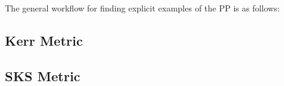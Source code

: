 The general workflow for finding explicit examples of the PP is as follows:
%
%

\subsection{Kerr Metric}
\label{ch:kerr_example}


\subsection{SKS Metric}
